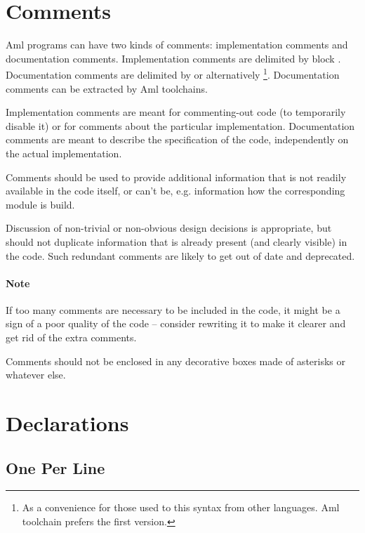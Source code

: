 \section{Comments}

Aml programs can have two kinds of comments: implementation comments and documentation comments. Implementation comments are delimited by block \code{(* $\ \ldots$ *)}. Documentation comments are delimited by \code{(*! $\ \ldots$ *)} or alternatively \code{(** $\ \ldots$ *)}\footnote{As a convenience for those used to this syntax from other languages. Aml toolchain prefers the first version.}. Documentation comments can be extracted by Aml toolchains.

Implementation comments are meant for commenting-out code (to temporarily disable it) or for comments about the particular implementation. Documentation comments are meant to describe the specification of the code, independently on the actual implementation. 

Comments should be used to provide additional information that is not readily available in the code itself, or can't be, e.g. information how the corresponding module is build. 

Discussion of non-trivial or non-obvious design decisions is appropriate, but should not duplicate information that is already present (and clearly visible) in the code. Such redundant comments are likely to get out of date and deprecated. 

\paragraph{Note}
If too many comments are necessary to be included in the code, it might be a sign of a poor quality of the code -- consider rewriting it to make it clearer and get rid of the extra comments. 

Comments should not be enclosed in any decorative boxes made of asterisks or whatever else. 





\section{Declarations}






\subsection{One Per Line}

